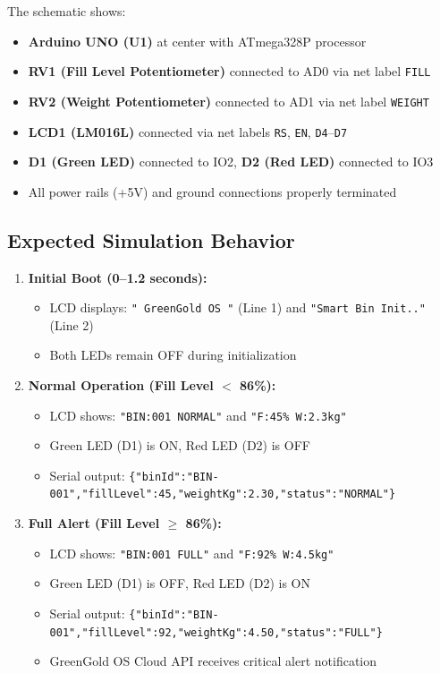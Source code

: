 \documentclass[12pt,a4paper]{article}
\begin{document}
\begin{tcolorbox}[colback=green!5!white, colframe=greengold, title=\textbf{Screenshot Description}]
The schematic shows:
\begin{itemize}[leftmargin=*]
    \item \textbf{Arduino UNO (U1)} at center with ATmega328P processor
    \item \textbf{RV1 (Fill Level Potentiometer)} connected to AD0 via net label \texttt{FILL}
    \item \textbf{RV2 (Weight Potentiometer)} connected to AD1 via net label \texttt{WEIGHT}
    \item \textbf{LCD1 (LM016L)} connected via net labels \texttt{RS}, \texttt{EN}, \texttt{D4}--\texttt{D7}
    \item \textbf{D1 (Green LED)} connected to IO2, \textbf{D2 (Red LED)} connected to IO3
    \item All power rails (+5V) and ground connections properly terminated
\end{itemize}
\end{tcolorbox}

\subsection{Expected Simulation Behavior}

\begin{enumerate}[leftmargin=*]
    \item \textbf{Initial Boot (0--1.2 seconds):}
    \begin{itemize}
        \item LCD displays: \texttt{"~GreenGold OS~"} (Line 1) and \texttt{"Smart Bin Init.."} (Line 2)
        \item Both LEDs remain OFF during initialization
    \end{itemize}

    \item \textbf{Normal Operation (Fill Level $<$ 86\%):}
    \begin{itemize}
        \item LCD shows: \texttt{"BIN:001 NORMAL"} and \texttt{"F:45\% W:2.3kg"}
        \item Green LED (D1) is ON, Red LED (D2) is OFF
        \item Serial output: \texttt{\{"binId":"BIN-001","fillLevel":45,"weightKg":2.30,"status":"NORMAL"\}}
    \end{itemize}

    \item \textbf{Full Alert (Fill Level $\geq$ 86\%):}
    \begin{itemize}
        \item LCD shows: \texttt{"BIN:001 FULL"} and \texttt{"F:92\% W:4.5kg"}
        \item Green LED (D1) is OFF, Red LED (D2) is ON
        \item Serial output: \texttt{\{"binId":"BIN-001","fillLevel":92,"weightKg":4.50,"status":"FULL"\}}
        \item GreenGold OS Cloud API receives critical alert notification
    \end{itemize}
\end{enumerate}
\end{document}
